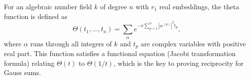 For an algebraic number field $k$ of degree $n$ with $r_1$ real embeddings, the theta function is defined as
$$\Theta(t_1, \ldots, t_n) = \sum_{\alpha} e^{-\pi \sum_{p=1}^{n} |\alpha^{(p)}|^2 t_p},$$
where $\alpha$ runs through all integers of $k$ and $t_p$ are complex variables with positive real part. This function satisfies a functional equation (Jacobi transformation formula) relating $\Theta(t)$ to $\Theta(1/t)$, which is the key to proving reciprocity for Gauss sums.

